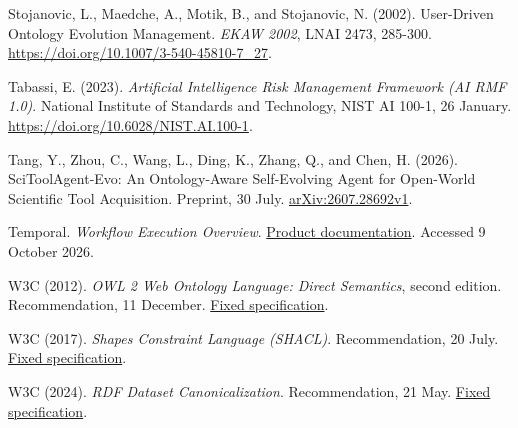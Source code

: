\documentclass[preprint,12pt,authoryear]{elsarticle}
\begin{document}
Stojanovic, L., Maedche, A., Motik, B., and Stojanovic, N. (2002).
User-Driven Ontology Evolution Management. \emph{EKAW 2002}, LNAI 2473,
285-300. \url{https://doi.org/10.1007/3-540-45810-7_27}.

Tabassi, E. (2023). \emph{Artificial Intelligence Risk Management
Framework (AI RMF 1.0)}. National Institute of Standards and Technology,
NIST AI 100-1, 26 January. \url{https://doi.org/10.6028/NIST.AI.100-1}.

Tang, Y., Zhou, C., Wang, L., Ding, K., Zhang, Q., and Chen, H. (2026).
SciToolAgent-Evo: An Ontology-Aware Self-Evolving Agent for Open-World
Scientific Tool Acquisition. Preprint, 30 July.
\href{https://arxiv.org/abs/2607.28692v1}{arXiv:2607.28692v1}.

Temporal. \emph{Workflow Execution Overview}.
\href{https://docs.temporal.io/workflow-execution}{Product
documentation}. Accessed 9 October 2026.

W3C (2012). \emph{OWL 2 Web Ontology Language: Direct Semantics}, second
edition. Recommendation, 11 December.
\href{https://www.w3.org/TR/2012/REC-owl2-direct-semantics-20121211/}{Fixed
specification}.

W3C (2017). \emph{Shapes Constraint Language (SHACL)}. Recommendation,
20 July. \href{https://www.w3.org/TR/2017/REC-shacl-20170720/}{Fixed
specification}.

W3C (2024). \emph{RDF Dataset Canonicalization}. Recommendation, 21 May.
\href{https://www.w3.org/TR/2024/REC-rdf-canon-20240521/}{Fixed
specification}.

\endgroup
\end{document}
